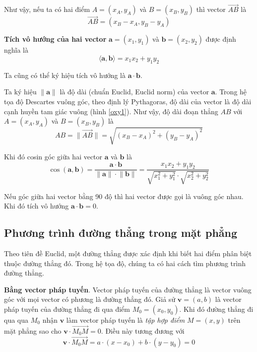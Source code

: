 Như vậy, nếu ta có hai điểm $A = (x_A, y_A)$ và $B = (x_B, y_B)$ thì vector $\overrightarrow{AB}$ là
\begin{equation}
	\overrightarrow{AB} = (x_B - x_A, y_B - y_A)
\end{equation}

\textbf{Tích vô hướng của hai vector} $\bm{a} = (x_1, y_1)$ và $\bm{b} = (x_2, y_2)$ được định nghĩa là
\begin{equation}
	\langle \bm{a}, \bm{b} \rangle = x_1 x_2 + y_1 y_2
\end{equation}

Ta cũng có thể ký hiệu tích vô hướng là $\bm{a} \cdot \bm{b}$.

Ta ký hiệu $\lVert \bm{a} \rVert$ là độ dài (chuẩn Euclid, Euclid norm) của vector $\bm{a}$. Trong hệ tọa độ Descartes vuông góc, theo định lý Pythagoras, độ dài của vector là độ dài cạnh huyền tam giác vuông (hình \ref{oxy1}). Như vậy, độ dài đoạn thẳng $AB$ với $A = (x_A, y_A)$ và $B = (x_B, y_B)$ là
\begin{equation}
	AB = \lVert \overrightarrow{AB} \rVert = \sqrt{(x_B - x_A)^2 + (y_B - y_A)^2}
\end{equation}

Khi đó cosin góc giữa hai vector $\bm{a}$ và $\bm{b}$ là
\begin{equation}
	\cos (\bm{a}, \bm{b}) = \frac{\bm{a} \cdot \bm{b}}{\lVert \bm{a} \rVert \cdot \lVert \bm{b} \rVert} = \frac{x_1 x_2 + y_1 y_2}{\sqrt{x_1^2 + y_1^2} \cdot \sqrt{x_2^2 + y_2^2}}
\end{equation}

Nếu góc giữa hai vector bằng 90 độ thì hai vector được gọi là vuông góc nhau. Khi đó tích vô hướng $\bm{a} \cdot \bm{b} = 0$.

\subsection*{Phương trình đường thẳng trong mặt phẳng}

Theo tiên đề Euclid, một đường thẳng được xác định khi biết hai điểm phân biệt thuộc đường thẳng đó. Trong hệ tọa độ, chúng ta có hai cách tìm phương trình đường thẳng.

\textbf{Bằng vector pháp tuyến}. Vector pháp tuyến của đường thẳng là vector vuông góc với mọi vector có phương là đường thẳng đó. Giả sử $\bm{v} = (a, b)$ là vector pháp tuyến của đường thẳng đi qua điểm $M_0 = (x_0, y_0)$. Khi đó đường thẳng đi qua qua $M_0$ nhận $\bm{v}$ làm vector pháp tuyến là \textit{tập hợp điểm} $M = (x, y)$ trên mặt phẳng sao cho $\bm{v} \cdot \overrightarrow{M_0 M} = 0$. Điều này tương đương với
\begin{equation}
	\bm{v} \cdot \overrightarrow{M_0 M} = a \cdot (x - x_0) + b \cdot (y - y_0) = 0
\end{equation}

